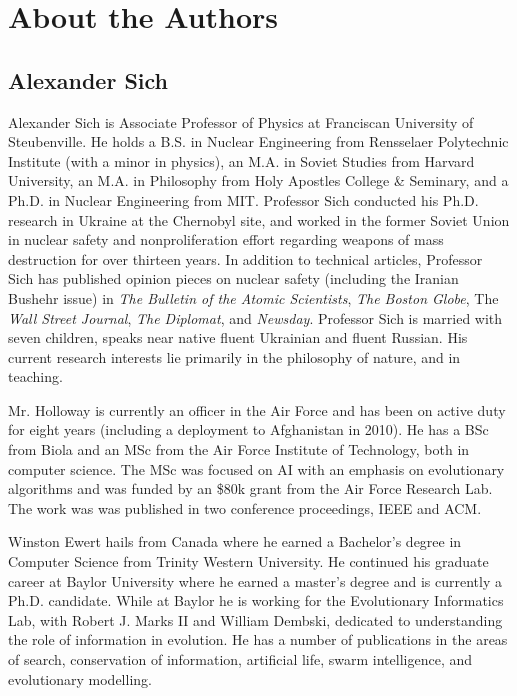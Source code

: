 \chapter{About the Authors}

\section*{Alexander Sich}

Alexander Sich is Associate Professor of Physics at Franciscan University of Steubenville. He holds a B.S. in Nuclear Engineering from Rensselaer Polytechnic Institute (with a minor in physics), an M.A. in Soviet Studies from Harvard University, an M.A. in Philosophy from Holy Apostles College \& Seminary, and a Ph.D. in Nuclear Engineering from MIT. Professor Sich conducted his Ph.D. research in Ukraine at the Chernobyl site, and worked in the former Soviet Union in nuclear safety and nonproliferation effort regarding weapons of mass destruction for over thirteen years. In addition to technical articles, Professor Sich has published opinion pieces on nuclear safety (including the Iranian Bushehr issue) in \emph{The Bulletin of the Atomic Scientists}, \emph{The Boston Globe}, The \emph{Wall Street Journal}, \emph{The Diplomat}, and \emph{Newsday}. Professor Sich is married with seven children, speaks near native fluent Ukrainian and fluent Russian. His current research interests lie primarily in the philosophy of nature, and in teaching.


Mr. Holloway is currently an officer in the Air Force and has been on
active duty for eight years (including a deployment to Afghanistan in
2010). He has a BSc from Biola and an MSc from the Air Force Institute
of Technology, both in computer science. The MSc was focused on AI
with an emphasis on evolutionary algorithms and was funded by an \$80k
grant from the Air Force Research Lab. The work was was published in
two conference proceedings, IEEE and ACM.


Winston Ewert hails from Canada where he earned a Bachelor's degree in Computer Science from Trinity Western University. He continued his graduate career at Baylor University where he earned a master's degree and is currently a Ph.D. candidate. While at Baylor he is working for the Evolutionary Informatics Lab, with Robert J. Marks II and William Dembski, dedicated to understanding the role of information in evolution. He has a number of publications in the areas of search, conservation of information, artificial life, swarm intelligence, and evolutionary modelling. 

